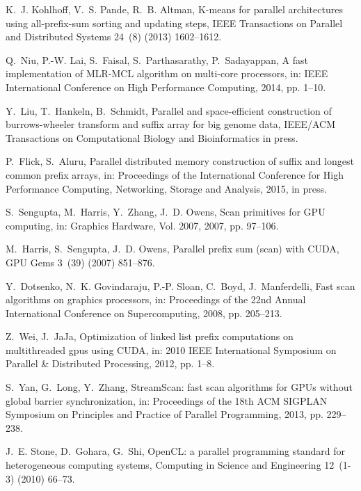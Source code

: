 \documentclass[article]{elsarticle}
\begin{document}
K.~J. Kohlhoff, V.~S. Pande, R.~B. Altman, {K}-means for parallel architectures
  using all-prefix-sum sorting and updating steps, IEEE Transactions on
  Parallel and Distributed Systems 24~(8) (2013) 1602--1612.

Q.~Niu, P.-W. Lai, S.~Faisal, S.~Parthasarathy, P.~Sadayappan, A fast
  implementation of {MLR-MCL} algorithm on multi-core processors, in: IEEE
  International Conference on High Performance Computing, 2014, pp. 1--10.

Y.~Liu, T.~Hankeln, B.~Schmidt, Parallel and space-efficient construction of
  burrows-wheeler transform and suffix array for big genome data, IEEE/ACM
  Transactions on Computational Biology and Bioinformatics in press.

P.~Flick, S.~Aluru, Parallel distributed memory construction of suffix and
  longest common prefix arrays, in: Proceedings of the International Conference
  for High Performance Computing, Networking, Storage and Analysis, 2015, in
  press.

S.~Sengupta, M.~Harris, Y.~Zhang, J.~D. Owens, Scan primitives for {GPU}
  computing, in: Graphics Hardware, Vol. 2007, 2007, pp. 97--106.

M.~Harris, S.~Sengupta, J.~D. Owens, Parallel prefix sum (scan) with {CUDA},
  GPU Gems 3~(39) (2007) 851--876.

Y.~Dotsenko, N.~K. Govindaraju, P.-P. Sloan, C.~Boyd, J.~Manferdelli, Fast scan
  algorithms on graphics processors, in: Proceedings of the 22nd Annual
  International Conference on Supercomputing, 2008, pp. 205--213.

Z.~Wei, J.~JaJa, Optimization of linked list prefix computations on
  multithreaded gpus using {CUDA}, in: 2010 IEEE International Symposium on
  Parallel \& Distributed Processing, 2012, pp. 1--8.

S.~Yan, G.~Long, Y.~Zhang, {StreamScan}: fast scan algorithms for {GPUs}
  without global barrier synchronization, in: Proceedings of the 18th ACM
  SIGPLAN Symposium on Principles and Practice of Parallel Programming, 2013,
  pp. 229--238.

J.~E. Stone, D.~Gohara, G.~Shi, {OpenCL}: a parallel programming standard for
  heterogeneous computing systems, Computing in Science and Engineering
  12~(1-3) (2010) 66--73.
\end{document}
